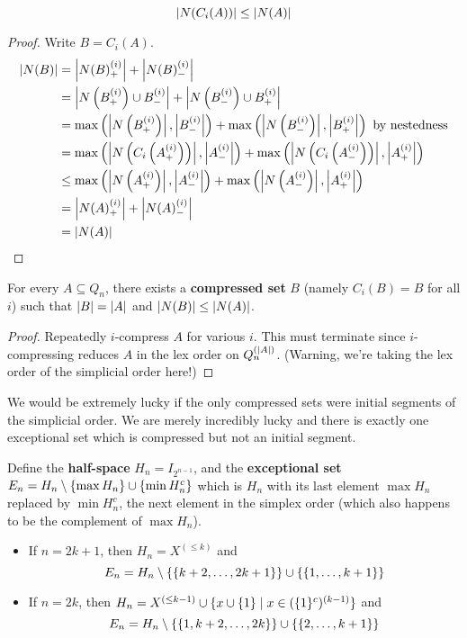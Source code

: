 \documentclass{article}
\begin{document}
\begin{nlemma}\label{lem:card-nhds-compress}
  $$\left\lvert N(C_i(A))\right\rvert \le \left\lvert N(A)\right\rvert$$
\end{nlemma}
\begin{proof}
  Write $B = C_i(A)$.
  \begin{align*}
    \left\lvert N(B)\right\rvert
    & = \left\lvert N(B)_+^{(i)}\right\rvert + \left\lvert N(B)_-^{(i)}\right\rvert \\
    & = \left\lvert N\left(B_+^{(i)}\right) \cup B_-^{(i)}\right\rvert + \left\lvert N\left(B_-^{(i)}\right) \cup B_+^{(i)}\right\rvert \\
    & = \max\left(\left\lvert N\left(B_+^{(i)}\right)\right\rvert, \left\lvert B_-^{(i)}\right\rvert\right) + \max\left(\left\lvert N\left(B_-^{(i)}\right)\right\rvert, \left\lvert B_+^{(i)}\right\rvert\right) \text{ by nestedness} \\
    & = \max\left(\left\lvert N\left(C_i\left(A_+^{(i)}\right)\right)\right\rvert, \left\lvert A_-^{(i)}\right\rvert\right) + \max\left(\left\lvert N\left(C_i\left(A_-^{(i)}\right)\right)\right\rvert, \left\lvert A_+^{(i)}\right\rvert\right) \\
    & \le \max\left(\left\lvert N\left(A_+^{(i)}\right)\right\rvert, \left\lvert A_-^{(i)}\right\rvert\right) + \max\left(\left\lvert N\left(A_-^{(i)}\right)\right\rvert, \left\lvert A_+^{(i)}\right\rvert\right) \\
    & = \left\lvert N(A)_+^{(i)}\right\rvert + \left\lvert N(A)_-^{(i)}\right\rvert \\
    & = \left\lvert N(A)\right\rvert
  \end{align*}
\end{proof}

\begin{nlemma}\label{lem:eventually-compress}
  For every $A \subseteq Q_n$, there exists a {\bf compressed set} $B$ (namely $C_i(B) = B$ for all $i$) such that $\left\lvert B\right\rvert = \left\lvert A\right\rvert$ and $\left\lvert N(B)\right\rvert \le \left\lvert N(A)\right\rvert$.
\end{nlemma}
\begin{proof}
  Repeatedly $i$-compress $A$ for various $i$. This must terminate since $i$-compressing reduces $A$ in the lex order on $Q_n^{(\left\lvert A\right\rvert)}$. (Warning, we're taking the lex order of the simplicial order here!)
\end{proof}

\newlec

We would be extremely lucky if the only compressed sets were initial segments of the simplicial order. We are merely incredibly lucky and there is exactly one exceptional set which is compressed but not an initial segment.

Define the {\bf half-space} $H_n = I_{2^{n - 1}}$, and the {\bf exceptional set} $E_n = H_n \setminus \{\max H_n\} \cup \{\min H_n^c\}$ which is $H_n$ with its last element $\max H_n$ replaced by $\min H_n^c$, the next element in the simplex order (which also happens to be the complement of $\max H_n$).
\begin{itemize}
  \item If $n = 2k + 1$, then $H_n = X^{(\le k)}$ and
  $$E_n = H_n \setminus \{\{k + 2, \dots, 2k + 1\}\} \cup \{\{1, \dots, k + 1\}\}$$
  \item If $n = 2k$, then $H_n = X^{(\le k - 1)} \cup \{x \cup \{1\} \mid  x \in (\{1\}^c)^{(k - 1)}\}$ and
  $$E_n = H_n \setminus \{\{1, k + 2, \dots, 2k\}\} \cup \{\{2, \dots, k + 1\}\}$$
\end{itemize}
\end{document}
